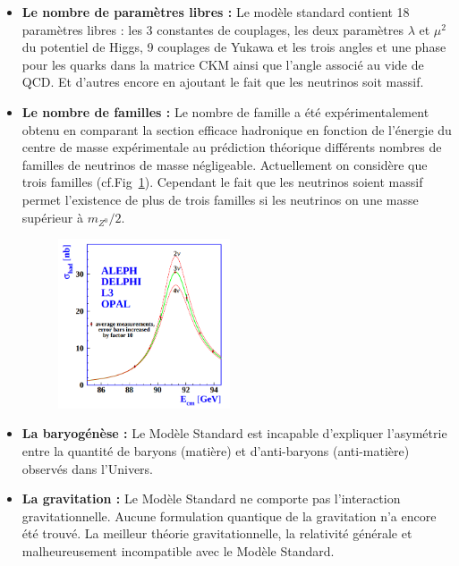 \begin{itemize}[label=$\bullet$]
\item \textbf{Le nombre de paramètres libres :} Le modèle standard contient \num{18} paramètres libres : les \num{3} constantes de couplages, les deux paramètres $\lambda$ et $\mu^2$ du potentiel de Higgs, \num{9} couplages de Yukawa et les trois angles et une phase pour les quarks dans la matrice CKM ainsi que l'angle associé au vide de QCD. Et d'autres encore en ajoutant le fait que les neutrinos soit massif.

\item \textbf{Le nombre de familles :} Le nombre de famille a été expérimentalement obtenu en comparant la section efficace hadronique en fonction de l'énergie du centre de masse expérimentale au prédiction théorique différents nombres de familles de neutrinos de masse négligeable. Actuellement on considère que trois familles (cf.Fig~\ref{neutrinos}). Cependant le fait que les neutrinos soient massif permet l'existence de plus de trois familles si les neutrinos on une masse supérieur à $m_{Z^{0}}/2$.
\begin{figure}[ht!]
\centering
\includegraphics[width=0.48\textwidth]{SM/neutrinos.png}
\label{neutrinos}
\end{figure}

\item \textbf{La baryogénèse :} Le Modèle Standard est incapable d'expliquer l'asymétrie entre la quantité de baryons (matière) et d'anti-baryons (anti-matière) observés dans l'Univers.

\item \textbf{La gravitation :} Le Modèle Standard ne comporte pas l'interaction gravitationnelle. Aucune formulation quantique de la gravitation n'a encore été trouvé. La meilleur théorie gravitationnelle, la relativité générale et malheureusement incompatible avec le Modèle Standard.


\end{itemize}
